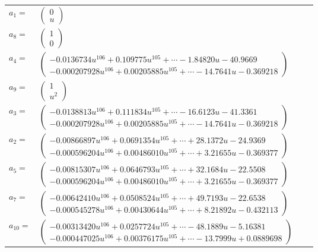 \documentclass[1p]{elsarticle_modified}
\theoremstyle{definition}
\begin{document}
\begin{tabular}{m{7pt} m{180pt} m{7pt} m{180pt} }
\flushright $a_{1}=$&$\begin{pmatrix}0\\u\end{pmatrix}$ \\
\flushright $a_{8}=$&$\begin{pmatrix}1\\0\end{pmatrix}$ \\
\flushright $a_{4}=$&$\begin{pmatrix}-0.0136734 u^{106}+0.109775 u^{105}+\cdots-1.84820 u-40.9669\\-0.000207928 u^{106}+0.00205885 u^{105}+\cdots-14.7641 u-0.369218\end{pmatrix}$ \\
\flushright $a_{9}=$&$\begin{pmatrix}1\\u^2\end{pmatrix}$ \\
\flushright $a_{3}=$&$\begin{pmatrix}-0.0138813 u^{106}+0.111834 u^{105}+\cdots-16.6123 u-41.3361\\-0.000207928 u^{106}+0.00205885 u^{105}+\cdots-14.7641 u-0.369218\end{pmatrix}$ \\
\flushright $a_{2}=$&$\begin{pmatrix}-0.00866897 u^{106}+0.0691354 u^{105}+\cdots+28.1372 u-24.9369\\-0.000596204 u^{106}+0.00486010 u^{105}+\cdots+3.21655 u-0.369377\end{pmatrix}$ \\
\flushright $a_{5}=$&$\begin{pmatrix}-0.00815307 u^{106}+0.0646793 u^{105}+\cdots+32.1684 u-22.5508\\-0.000596204 u^{106}+0.00486010 u^{105}+\cdots+3.21655 u-0.369377\end{pmatrix}$ \\
\flushright $a_{7}=$&$\begin{pmatrix}-0.00642410 u^{106}+0.0508524 u^{105}+\cdots+49.7193 u-22.6538\\-0.000545278 u^{106}+0.00430644 u^{105}+\cdots+8.21892 u-0.432113\end{pmatrix}$ \\
\flushright $a_{10}=$&$\begin{pmatrix}-0.00313420 u^{106}+0.0257724 u^{105}+\cdots-48.1889 u-5.16381\\-0.000447025 u^{106}+0.00376175 u^{105}+\cdots-13.7999 u+0.0889698\end{pmatrix}$ \\

\end{tabular}
\end{document}
